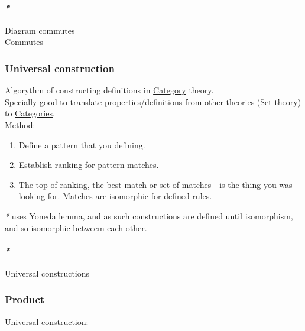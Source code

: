 \documentclass[11pt]{article}
\begin{document}
\paragraph{\emph{*}}
\label{sec:orgda42b54}

\label{org8da38e9}Diagram commutes\\
\label{org35f49d5}Commutes\\

\subsubsection{\label{org8221fde}Universal construction}
\label{sec:org8f7d344}
Algorythm of constructing definitions in \hyperref[org0450535]{Category} theory.\\
Specially good to translate \hyperref[org85fb3a1]{properties}/definitions from other theories (\hyperref[org1cc9425]{Set theory}) to \hyperref[org2f49b91]{Categories}.\\

Method:\\
\begin{enumerate}
\item Define a pattern that you defining.\\
\item Establish ranking for pattern matches.\\
\item The top of ranking, the best match or \hyperref[org1faf06d]{set} of matches - is the thing you was looking for. Matches are \hyperref[org5910739]{isomorphic} for defined rules.\\
\end{enumerate}

\emph{*} uses Yoneda lemma, and as such constructions are defined until \hyperref[org91df03a]{isomorphism}, and so \hyperref[org5910739]{isomorphic} betweem each-other.\\

\paragraph{\emph{*}}
\label{sec:orgfccd232}

\label{org6cc9348}Universal constructions\\

\subsubsection{\label{org80a0b6e}Product}
\label{sec:org999c4e6}
\hyperref[org8221fde]{Universal construction}:\\
\end{document}
